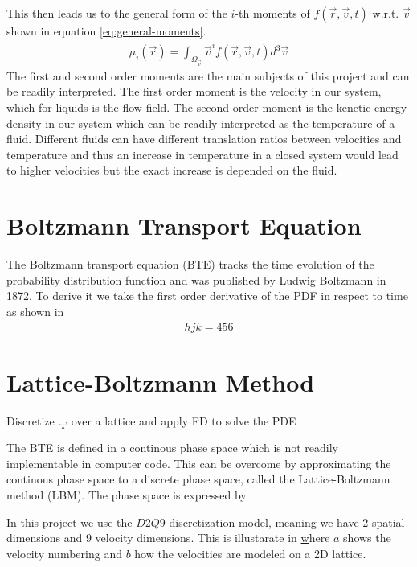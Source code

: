 \documentclass[a4paper,11pt]{article}
\begin{document}
This then leads us to the general form of the $i$-th moments of $ f(\vec{r},\vec{v},t) $ w.r.t. $ \vec{v} $ shown in equation \ref{eq:general-moments}.
\begin{equation}
    \label{eq:general-moments}
    \begin{aligned}
        \mu_{i}(\vec{r}) =\int_{\Omega_{\vec{v}}}\vec{v}^{i} f(\vec{r},\vec{v},t)d^{3}\vec{v}
    \end{aligned}
\end{equation}
The first and second order moments are the main subjects of this project and can be readily interpreted.
The first order moment is the velocity in our system, which for liquids is the flow field.
The second order moment is the kenetic energy density in our system which can be readily interpreted as the temperature of a fluid.
Different fluids can have different translation ratios between velocities and temperature and thus an increase in temperature in a closed system would lead to higher velocities but the exact increase is depended on the fluid.


\section{Boltzmann Transport Equation}
The Boltzmann transport equation (BTE) tracks the time evolution of the probability distribution function and was published by Ludwig Boltzmann in 1872.
To derive it we take the first order derivative of the PDF in respect to time as shown in
\begin{equation}
    \label{eq:BLT}
    \begin{aligned}
        hjk =456
    \end{aligned}
\end{equation}


\section{Lattice-Boltzmann Method}

Discretize ݒ over a lattice and apply FD to solve the PDE

The BTE is defined in a continous phase space which is not readily implementable in computer code.
This can be overcome by approximating the continous phase space to a discrete phase space, called the Lattice-Boltzmann method (LBM).
The phase space is expressed by

In this project we use the $D2Q9$ discretization model, meaning we have 2 spatial dimensions and $9$ velocity dimensions. This is illustarate in \href{fig:d2q9-scheme} where $a$ shows the velocity numbering and $b$ how the velocities are modeled on a 2D lattice.
\end{document}
